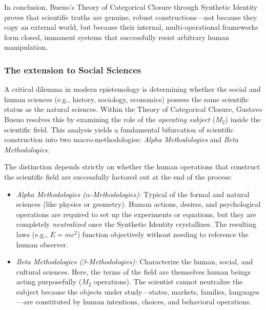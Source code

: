 \documentclass[11pt, a4paper]{article}
\begin{document}
In conclusion, Bueno's Theory of Categorical Closure through Synthetic Identity proves that scientific truths are genuine, robust constructions---not because they copy an external world, but because their internal, multi-operational frameworks form closed, immanent systems that successfully resist arbitrary human manipulation.

\subsubsection{The extension to Social Sciences}

A critical dilemma in modern epistemology is determining whether the social and human sciences (e.g., history, sociology, economics) possess the same scientific status as the natural sciences. Within the Theory of Categorical Closure, Gustavo Bueno resolves this by examining the role of the \emph{operating subject} ($M_2$) inside the scientific field. This analysis yields a fundamental bifurcation of scientific construction into two macro-methodologies: \emph{Alpha Methodologies} and \emph{Beta Methodologies}.

The distinction depends strictly on whether the human operations that construct the scientific field are successfully factored out at the end of the process:
\begin{itemize}
    \item \emph{Alpha Methodologies ($\alpha$-Methodologies):} Typical of the formal and natural sciences (like physics or geometry). Human actions, desires, and psychological operations are required to set up the experiments or equations, but they are completely \emph{neutralized} once the Synthetic Identity crystallizes. The resulting laws (e.g., $E=mc^2$) function objectively without needing to reference the human observer.
    \item \emph{Beta Methodologies ($\beta$-Methodologies):} Characterize the human, social, and cultural sciences. Here, the terms of the field are themselves human beings acting purposefully ($M_2$ operations). The scientist cannot neutralize the subject because the objects under study—states, markets, families, languages—are constituted by human intentions, choices, and behavioral operations.
\end{itemize}
\end{document}
